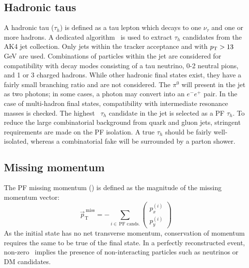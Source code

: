 \subsection{Hadronic taus}

A hadronic tau ($\tau_h$) is defined as a tau lepton which decays to one $\nu_\tau$ and one or more hadrons.
A dedicated algorithm~\cite{cmspf,tauid} is used to extract $\tau_h$ candidates from the AK4 jet collection.
Only jets within the tracker acceptance and with $p_\mathrm{T}>13$ GeV are used.
Combinations of particles within the jet are considered for compatibility with decay modes consisting of a tau neutrino, 0-2 neutral pions, and 1 or 3 charged hadrons.
While other hadronic final states exist, they have a fairly small branching ratio and are not considered.
The $\pi^0$ will present in the jet as two photons; in some cases, a photon may convert into an $e^-e^+$ pair. 
In the case of multi-hadron final states, compatibility with intermediate resonance masses is checked.
The highest \pt~$\tau_h$ candidate in the jet is selected as a PF $\tau_h$.
To reduce the large combinatorial background from quark and gluon jets, stringent requirements are made on the PF isolation.
A true $\tau_h$ should be fairly well-isolated, whereas a combinatorial fake will be surrounded by a parton shower. 

\subsection{Missing momentum}
\label{sec:cms:met}

The PF missing momentum (\ptmiss) is defined as the magnitude of the missing momentum vector:
\begin{equation}
    \vec{p}_\mathrm{T}^\mathrm{~miss} = -\sum_{i\in\,\text{PF cands.}} \left(\begin{matrix} p_x^{(i)} \\ p_y^{(i)} \end{matrix}\right)
\end{equation}
As the initial state has no net transverse momentum, conservation of momentum requires the same to be true of the final state.
In a perfectly reconstructed event, non-zero \ptmiss~implies the presence of non-interacting particles such as neutrinos or DM candidates.

